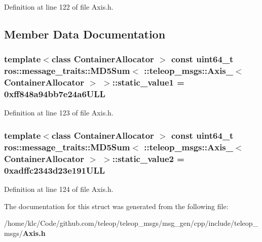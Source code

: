 Definition at line 122 of file Axis.h.



\subsection{Member Data Documentation}
\subsubsection[{static\_\-value1}]{\setlength{\rightskip}{0pt plus 5cm}template$<$class ContainerAllocator $>$ const uint64\_\-t ros::message\_\-traits::MD5Sum$<$ ::{\bf teleop\_\-msgs::Axis\_\-}$<$ ContainerAllocator $>$ $>$::{\bf static\_\-value1} = 0xff848a94bb7e24a6ULL\hspace{0.3cm}{\ttfamily  [static]}}\label{structros_1_1message__traits_1_1MD5Sum_3_01_1_1teleop__msgs_1_1Axis___3_01ContainerAllocator_01_4_01_4_a7cc6303c5e9e581a8c17b943c954e3af}


Definition at line 123 of file Axis.h.

\subsubsection[{static\_\-value2}]{\setlength{\rightskip}{0pt plus 5cm}template$<$class ContainerAllocator $>$ const uint64\_\-t ros::message\_\-traits::MD5Sum$<$ ::{\bf teleop\_\-msgs::Axis\_\-}$<$ ContainerAllocator $>$ $>$::{\bf static\_\-value2} = 0xadffc2343d23e191ULL\hspace{0.3cm}{\ttfamily  [static]}}\label{structros_1_1message__traits_1_1MD5Sum_3_01_1_1teleop__msgs_1_1Axis___3_01ContainerAllocator_01_4_01_4_a7d66e82e0c65cad60af323820d8bffd6}


Definition at line 124 of file Axis.h.



The documentation for this struct was generated from the following file:\begin{DoxyCompactItemize}
\item 
/home/klc/Code/github.com/teleop/teleop\_\-msgs/msg\_\-gen/cpp/include/teleop\_\-msgs/{\bf Axis.h}\end{DoxyCompactItemize}
